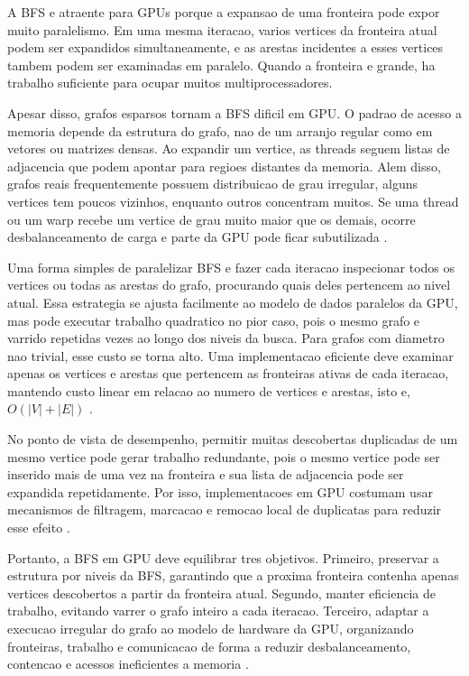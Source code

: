 A BFS e atraente para GPUs porque a expansao de uma fronteira pode expor muito
paralelismo. Em uma mesma iteracao, varios vertices da fronteira atual podem ser
expandidos simultaneamente, e as arestas incidentes a esses vertices tambem podem
ser examinadas em paralelo. Quando a fronteira e grande, ha trabalho suficiente
para ocupar muitos multiprocessadores. 

Apesar disso, grafos esparsos tornam a BFS dificil em GPU. O padrao de acesso a
memoria depende da estrutura do grafo, nao de um arranjo regular como em vetores
ou matrizes densas. Ao expandir um vertice, as threads seguem listas de
adjacencia que podem apontar para regioes distantes da memoria. Alem disso, grafos
reais frequentemente possuem distribuicao de grau irregular, alguns vertices tem
poucos vizinhos, enquanto outros concentram muitos. Se uma thread ou um warp recebe 
um vertice de grau muito maior que os demais, ocorre desbalanceamento de carga e 
parte da GPU pode ficar subutilizada \cite{merrillgpu}.

Uma forma simples de paralelizar BFS e fazer cada iteracao inspecionar todos os 
vertices ou todas as arestas do grafo, procurando quais deles pertencem ao nivel atual. 
Essa estrategia se ajusta facilmente ao modelo de dados paralelos da GPU, mas pode
executar trabalho quadratico no pior caso, pois o mesmo grafo e varrido repetidas
vezes ao longo dos niveis da busca. Para grafos com diametro nao trivial, esse
custo se torna alto. Uma implementacao eficiente deve examinar apenas os vertices
e arestas que pertencem as fronteiras ativas de cada iteracao, mantendo custo
linear em relacao ao numero de vertices e arestas, isto e, $O(|V| + |E|)$
\cite{merrillgpu}.

No ponto de vista de desempenho, permitir muitas descobertas duplicadas de um mesmo 
vertice pode gerar trabalho redundante, pois o mesmo vertice pode ser inserido mais 
de uma vez na fronteira e sua lista de adjacencia pode ser expandida repetidamente. 
Por isso, implementacoes em GPU costumam usar mecanismos de filtragem, marcacao e 
remocao local de duplicatas para reduzir esse efeito \cite{merrillgpu}.

Portanto, a BFS em GPU deve equilibrar tres objetivos. Primeiro, preservar a
estrutura por niveis da BFS, garantindo que a proxima fronteira contenha apenas
vertices descobertos a partir da fronteira atual. Segundo, manter eficiencia de
trabalho, evitando varrer o grafo inteiro a cada iteracao. Terceiro, adaptar a
execucao irregular do grafo ao modelo de hardware da GPU, organizando fronteiras,
trabalho e comunicacao de forma a reduzir desbalanceamento, contencao e acessos
ineficientes a memoria
\cite{merrillgpu}.
